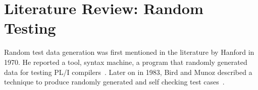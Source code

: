 \chapter{Literature Review: Random Testing}
\label{chap:randomTesting}


Random test data generation was first mentioned in the literature by Hanford in 1970. He reported a tool, syntax machine, a program that randomly generated data for testing PL/I compilers~\cite{hanford1970automatic}. Later on in 1983, Bird and Munoz described a technique to produce randomly generated and self checking test cases~\cite{bird1983automatic}. 



